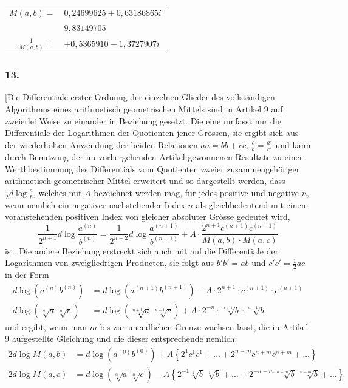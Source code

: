 \documentclass[12pt,a4paper]{article}
\begin{document}
\begin{center}
\begin{tabular}{r@{\ }l}
$M(a,b) =$ & $0{,}24699625 + 0{,}63186865i$ \\
& $9{,}83149705$ \\
$\frac{1}{M(a,b)} =$ & $+0{,}5365910 - 1{,}3727907i$
\end{tabular}
\end{center}

\subsubsection*{13.}

[Die Differentiale erster Ordnung der einzelnen Glieder des vollst\"andigen Algorithmus eines arithmetisch geometrischen Mittels sind in Artikel 9 auf zweierlei Weise zu einander in Beziehung gesetzt. Die eine umfasst nur die Differentiale der Logarithmen der Quotienten jener Gr\"ossen, sie ergibt sich aus der wiederholten Anwendung der beiden Relationen $aa = bb + cc$, $\frac{c}{b} = \frac{a'}{c'}$ und kann durch Benutzung der im vorhergehenden Artikel gewonnenen Resultate zu einer Werthbestimmung des Differentials vom Quotienten zweier zusammengeh\"origer arithmetisch geometrischer Mittel erweitert und so dargestellt werden, dass $\frac{1}{2}d\log\frac{a}{b}$, welches mit $A$ bezeichnet werden mag, f\"ur jedes positive und negative $n$, wenn nemlich ein negativer nachstehender Index $n$ als gleichbedeutend mit einem voranstehenden positiven Index von gleicher absoluter Gr\"osse gedeutet wird,
\[
\frac{1}{2^{n+1}} d\log\frac{a^{(n)}}{b^{(n)}} = \frac{1}{2^{n+2}} d\log\frac{a^{(n+1)}}{b^{(n+1)}} + A\cdot\frac{2^{n+1}c^{(n+1)}c^{(n+1)}}{M(a,b)\cdot M(a,c)}
\]
ist. Die andere Beziehung erstreckt sich auch mit auf die Differentiale der Logarithmen von zweigliedrigen Producten, sie folgt aus $b'b'=ab$ und $c'c'=\tfrac{1}{2}ac$ in der Form
\[
\begin{aligned}
d\log(a^{(n)}b^{(n)}) &= d\log(a^{(n+1)}b^{(n+1)}) - A\cdot 2^{n+1}\cdot c^{(n+1)}\cdot c^{(n+1)} \\
d\log(\sqrt[n]{a}\,\sqrt[n]{c}) &= d\log(\sqrt[n+1]{a}\,\sqrt[n+1]{c}) + A\cdot 2^{-n}\cdot\sqrt[n+1]{b}\cdot\sqrt[n+1]{b}
\end{aligned}
\]
und ergibt, wenn man $m$ bis zur unendlichen Grenze wachsen l\"asst, die in Artikel 9 aufgestellte Gleichung und die dieser entsprechende nemlich:
\[
\begin{aligned}
2d\log M(a,b) &= d\log(a^{(0)}b^{(0)}) + A\left\{2^{1}c^{1}c^{1} + \dots + 2^{n+m}c^{n+m}c^{n+m} + \dots\right\} \\
2d\log M(a,c) &= d\log(\sqrt[0]{a}\,\sqrt[0]{c}) - A\left\{2^{-1}\sqrt[1]{b}\,\sqrt[1]{b} + \dots + 2^{-n-m}\sqrt[n+m]{b}\,\sqrt[n+m]{b} + \dots\right\}
\end{aligned}
\]
\end{document}
